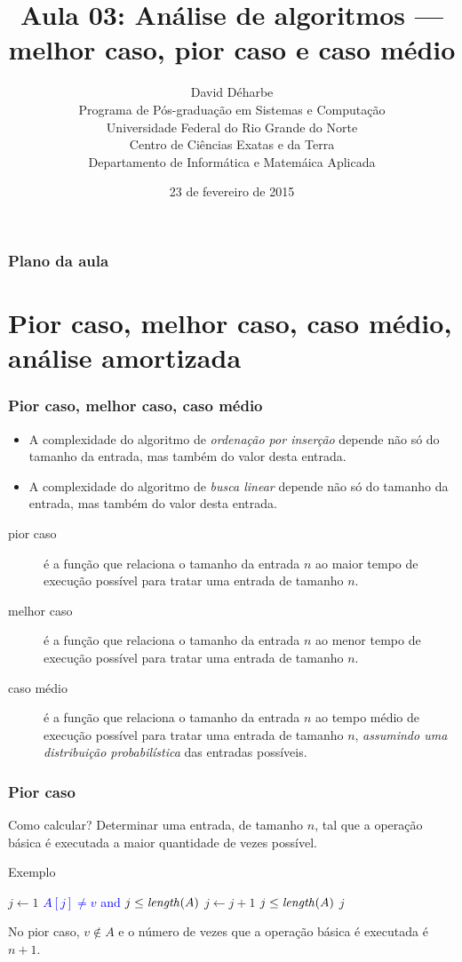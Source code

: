 \documentclass[handout]{beamer}
\title{Aula 03: Análise de algoritmos --- melhor caso, pior caso e caso médio}
\author{David Déharbe \\
  Programa de Pós-graduação em Sistemas e Computação \\
  Universidade Federal do Rio Grande do Norte \\
  Centro de Ciências Exatas e da Terra \\
  Departamento de Informática e Matemáica Aplicada}
\date{23 de fevereiro de 2015}
\begin{document}

\begin{frame}
  \titlepage
\end{frame}

\begin{frame}
  \frametitle{Plano da aula}
  \tableofcontents
\end{frame}

\section{Pior caso, melhor caso, caso médio, análise amortizada}

\begin{frame}
\frametitle{Pior caso, melhor caso, caso médio}

\begin{itemize}
\item A complexidade do algoritmo de \emph{ordenação por inserção} depende não
  só do tamanho da entrada, mas também do valor desta entrada.
\item A complexidade do algoritmo de \emph{busca linear} depende não só do
  tamanho da entrada, mas também do valor desta entrada.
\end{itemize}
\pause
\begin{description}
\item[pior caso] é a função que relaciona o tamanho da entrada $n$ ao maior tempo de execução possível para tratar uma entrada de tamanho $n$.
\item[melhor caso] é a função que relaciona o tamanho da entrada $n$ ao menor tempo de execução possível para tratar uma entrada de tamanho $n$.
\item[caso médio] é a função que relaciona o tamanho da entrada $n$ ao tempo médio de execução possível para tratar uma entrada de tamanho $n$, \emph{assumindo uma distribuição probabilística} das entradas possíveis.
\end{description}
\end{frame}

\begin{frame}
\frametitle{Pior caso}

\begin{block}{Como calcular?}
Determinar uma entrada, de tamanho $n$, tal que a operação básica é executada a maior quantidade de vezes possível.
\end{block}

\begin{block}{Exemplo}
\begin{codebox}
\li $j \gets 1$
\li \While \textcolor{blue}{$A[j] \neq v$ and $j \le \id{length}(A)$}
\li \Do
      $j \gets j+1$
    \End
\li \If $j \le \id{length}(A)$
\li \Then
      \Return $j$
\li \Else
      \Return {}
    \End
\end{codebox}
No pior caso, $v \not\in A$ e o número de vezes que a operação básica é
executada é $n+1$.
\end{block}

\end{frame}
\end{document}
